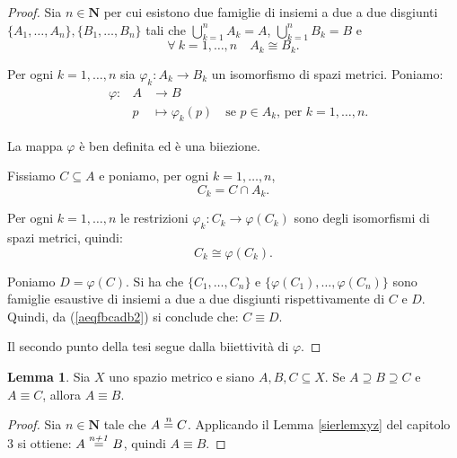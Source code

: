 \documentclass[a4paper,oneside,11pt]{book}
\theoremstyle{definition} \newtheorem{Def}{Definizione}
\theoremstyle{plain} \newtheorem{teo}{Teorema}
\theoremstyle{plain} \newtheorem{cor}[teo]{Corollario}
\theoremstyle{definition} \newtheorem{lem}[teo]{Lemma}
\theoremstyle{plain} \newtheorem{pro}[teo]{Proposizione}
\newcommand{\eqf}{\equiv}
\newcommand{\ug}[1]{(\ref{#1})} %
\newcommand{\eqn}[1]{\stackrel{\text{\textit{#1}}}{=}}
\begin{document}
	\begin{proof}
		Sia $n \in \mathbf{N}$ per cui esistono due famiglie di insiemi a due a due disgiunti $\{A_1, \dots, A_n\}, \{B_1, \dots, B_n\}$ tali che $\bigcup\limits_{k=1}^n A_k = A$, $\bigcup\limits_{k=1}^n B_k = B$ e
		\begin{equation}\label{aeqfbcadb1}
			\forall\ k = 1, \dots, n \quad A_k \cong B_k \text{.}
		\end{equation}
		
		Per ogni $k= 1, \dots, n$ sia $\varphi_k : A_k \to B_k$ un isomorfismo di spazi metrici. Poniamo:
		\begin{equation*}
			\begin{aligned}
				&\varphi: &A &\to B\\
				& &p &\mapsto \varphi_k (p) \quad \text{se  $p \in A_k$, per $k = 1, \dots, n$.}
			\end{aligned}
		\end{equation*}
		
		La mappa $\varphi$ è ben definita ed è una biiezione.
		
		Fissiamo $C \subseteq A$ e poniamo, per ogni $k = 1, \dots, n$,
		\begin{equation*}
			C_k = C \cap A_k \text{.}
		\end{equation*}

		Per ogni $k = 1, \dots, n$ le restrizioni $\varphi_k: C_k \to \varphi(C_k)$ sono degli isomorfismi di spazi metrici, quindi:
		\begin{equation}\label{aeqfbcadb2}
			C_k \cong \varphi(C_k) \text{.}
		\end{equation}
		
		Poniamo $D = \varphi(C)$. Si ha che $\{C_1, \dots, C_n\}$ e $\{\varphi(C_1), \dots, \varphi(C_n)\}$ sono famiglie esaustive di insiemi a due a due disgiunti rispettivamente di $C$ e $D$. Quindi, da \ug{aeqfbcadb2} si conclude che: $C \eqf D$.
		
		Il secondo punto della tesi segue dalla biiettività di $\varphi$.
	\end{proof}
	
	\begin{lem}\label{eqfabc} %
		Sia $X$ uno spazio metrico e siano $A, B, C \subseteq X$. Se $A \supseteq B \supseteq C$ e $A \eqf C$, allora $A \eqf B$.
	\end{lem}
	
	\begin{proof}
		Sia $n \in \mathbf{N}$ tale che $A \eqn{n} C$. Applicando il Lemma \ref{sierlemxyz} del capitolo 3 si ottiene: $A \eqn{n+1} B$, quindi $A \eqf B$.
	\end{proof}
	
\end{document}
